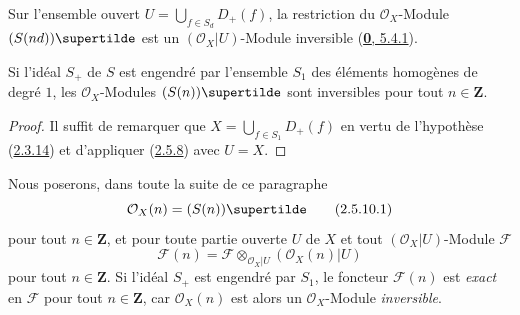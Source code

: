 \begin{corollary}[2.5.8]
\label{II.2.5.8-fr}
Sur l'ensemble ouvert
$U=\bigcup_{f\in S_d}D_+(f)$,
la restriction du $\mathcal{O}_X$-Module $(S(nd))\supertilde$ est un
$(\mathcal{O}_X|U)$-Module inversible
(\hyperref[0.5.4.1-fr]{\textbf{0}, 5.4.1}).
\end{corollary}

\begin{corollary}[2.5.9]
\label{II.2.5.9-fr}
Si l'idéal $S_+$ de $S$ est engendré par l'ensemble $S_1$ des éléments
homogènes de degré $1$, les $\mathcal{O}_X$-Modules
$(S(n))\supertilde$ sont inversibles pour tout $n\in\mathbf{Z}$.
\end{corollary}

\begin{proof}
Il suffit de remarquer que
$X=\bigcup_{f\in S_1}D_+(f)$ en vertu de l'hypothèse
(\hyperref[II.2.3.14-fr]{2.3.14}) et d'appliquer
(\hyperref[II.2.5.8-fr]{2.5.8}) avec $U=X$.
\end{proof}

\begin{env}[2.5.10]
\label{II.2.5.10-fr}
Nous poserons, dans toute la suite de ce paragraphe
\[
\label{II.2.5.10.1-fr}
  \mathcal{O}_X(n)=(S(n))\supertilde
\tag{2.5.10.1}
\]
pour tout $n\in\mathbf{Z}$, et pour toute partie ouverte $U$ de $X$ et tout
$(\mathcal{O}_X|U)$-Module $\mathcal{F}$
\[
\label{II.2.5.10.2-fr}
  \mathcal{F}(n)=
  \mathcal{F}\otimes_{\mathcal{O}_X|U}(\mathcal{O}_X(n)|U)
\tag{2.5.10.2}
\]
pour tout $n\in\mathbf{Z}$. Si l'idéal $S_+$ est engendré par $S_1$, le
foncteur $\mathcal{F}(n)$ est \emph{exact} en
$\mathcal{F}$ pour tout $n\in\mathbf{Z}$, car $\mathcal{O}_X(n)$ est alors
un $\mathcal{O}_X$-Module \emph{inversible}.
\end{env}

